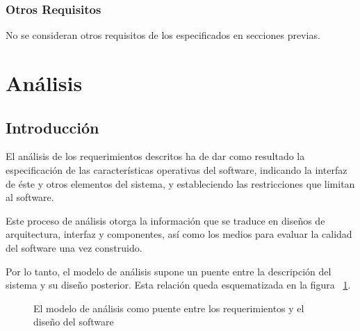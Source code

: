 \subsubsection{Otros Requisitos}

No se consideran otros requisitos de los especificados en secciones previas.



\section{Análisis}
\label{sec:secModeloAn}

\subsection{Introducción}

El análisis de los requerimientos descritos ha de dar como resultado la especificación de las características operativas del software, indicando la interfaz de éste y otros elementos del sistema, y estableciendo las restricciones que limitan al software.

Este proceso de análisis otorga la información que se traduce en diseños de arquitectura, interfaz y componentes, así como los medios para evaluar la calidad del software una vez construido. 

Por lo tanto, el modelo de análisis supone un puente entre la descripción del sistema y su diseño posterior. Esta relación queda esquematizada en la figura ~\ref{fig:modeloAnalisis}.

\begin{figure}
	\centering
	\caption{El modelo de análisis como puente entre los requerimientos y el diseño del software}
	\label{fig:modeloAnalisis}
\end{figure}

